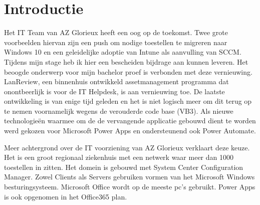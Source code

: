 
\section{Introductie} %
\label{sec:introductie}

Het IT Team van AZ Glorieux heeft een oog op de toekomst. Twee grote voorbeelden hiervan zijn een push om nodige toestellen te migreren naar Windows 10 en een geleidelijke adoptie van Intune als aanvulling van SCCM. Tijdens mijn stage heb ik hier een bescheiden bijdrage aan kunnen leveren. Het beoogde onderwerp voor mijn bachelor proef is verbonden met deze vernieuwing. LanReview, een binnenhuis ontwikkeld assetmanagement programma dat onontbeerlijk is voor de IT Helpdesk, is aan vernieuwing toe. De laatste ontwikkeling is van enige tijd geleden en het is niet logisch meer om dit terug op te nemen voornamelijk wegens de verouderde code base (VB3). Als nieuwe technologieën waarmee om de de vervangende applicatie gebouwd dient te worden werd gekozen voor Microsoft Power Apps en ondersteunend ook Power Automate.

Meer achtergrond over de IT voorziening van AZ Glorieux verklaart deze keuze. Het is een groot regionaal ziekenhuis met een netwerk waar meer dan 1000 toestellen in zitten. Het domein is gebouwd met System Center Configuration Manager. Zowel Clients als Servers gebruiken vormen van het Microsoft Windows besturingsysteem. Microsoft Office wordt op de meeste pc's gebruikt. Power Apps is ook opgenomen in het Office365 plan.

\vspace{5mm}

